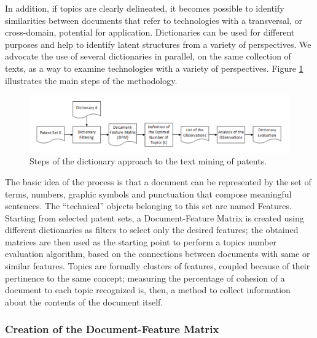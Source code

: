 \documentclass[b5paper,]{book}
\theoremstyle{definition}
\theoremstyle{definition}
\theoremstyle{definition}
\theoremstyle{remark}
\begin{document}
In addition, if topics are clearly delineated, it becomes possible to
identify similarities between documents that refer to technologies with
a transversal, or cross-domain, potential for application. Dictionaries
can be used for different purposes and help to identify latent
structures from a variety of perspectives. We advocate the use of
several dictionaries in parallel, on the same collection of texts, as a
way to examine technologies with a variety of perspectives. Figure
\ref{fig:dictwf} illustrates the main steps of the methodology.

\begin{figure}

{\centering \includegraphics[width=0.8\linewidth]{_bookdown_files/figures/dictwf} 

}

\caption{Steps of the dictionary approach to the text mining of patents.}\label{fig:dictwf}
\end{figure}

The basic idea of the process is that a document can be represented by
the set of terms, numbers, graphic symbols and punctuation that compose
meaningful sentences. The ``technical'' objects belonging to this set
are named Features. Starting from selected patent sets, a
Document-Feature Matrix is created using different dictionaries as
filters to select only the desired features; the obtained matrices are
then used as the starting point to perform a topics number evaluation
algorithm, based on the connections between documents with same or
similar features. Topics are formally clusters of features, coupled
because of their pertinence to the same concept; measuring the
percentage of cohesion of a document to each topic recognized is, then,
a method to collect information about the contents of the document
itself.

\subsubsection*{Creation of the Document-Feature
Matrix}\label{creation-of-the-document-feature-matrix}
\end{document}
